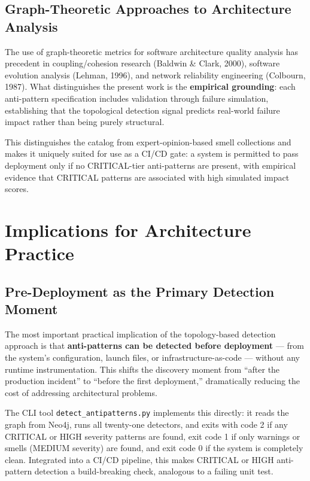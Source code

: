 \documentclass[11pt]{article}
\begin{document}
\subsection{Graph-Theoretic Approaches to Architecture Analysis}

The use of graph-theoretic metrics for software architecture quality analysis has precedent in coupling/cohesion research (Baldwin \& Clark, 2000), software evolution analysis (Lehman, 1996), and network reliability engineering (Colbourn, 1987). What distinguishes the present work is the \textbf{empirical grounding}: each anti-pattern specification includes validation through failure simulation, establishing that the topological detection signal predicts real-world failure impact rather than being purely structural.

This distinguishes the catalog from expert-opinion-based smell collections and makes it uniquely suited for use as a CI/CD gate: a system is permitted to pass deployment only if no CRITICAL-tier anti-patterns are present, with empirical evidence that CRITICAL patterns are associated with high simulated impact scores.

\section{Implications for Architecture Practice}

\subsection{Pre-Deployment as the Primary Detection Moment}

The most important practical implication of the topology-based detection approach is that \textbf{anti-patterns can be detected before deployment} --- from the system's configuration, launch files, or infrastructure-as-code --- without any runtime instrumentation. This shifts the discovery moment from ``after the production incident'' to ``before the first deployment,'' dramatically reducing the cost of addressing architectural problems.

The CLI tool \texttt{detect\_antipatterns.py} implements this directly: it reads the graph from Neo4j, runs all twenty-one detectors, and exits with code 2 if any CRITICAL or HIGH severity patterns are found, exit code 1 if only warnings or smells (MEDIUM severity) are found, and exit code 0 if the system is completely clean. Integrated into a CI/CD pipeline, this makes CRITICAL or HIGH anti-pattern detection a build-breaking check, analogous to a failing unit test.
\end{document}
